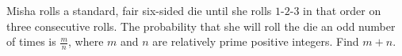 Misha rolls a standard, fair six-sided die until she rolls $1$-$2$-$3$ in that order on three consecutive rolls. The probability that she will roll the die an odd number of times is $\tfrac{m}{n}$,  where $m$ and $n$ are relatively prime positive integers. Find $m+n$.